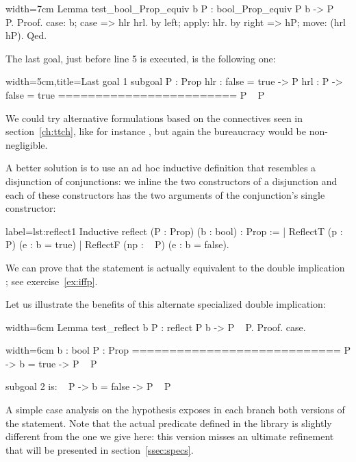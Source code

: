 \begin{coq}{}{width=7cm}
Lemma test_bool_Prop_equiv b P : bool_Prop_equiv P b -> P \/ ~ P.
Proof.
case: b; case => hlr hrl.
  by left; apply: hlr.
by right => hP; move: (hrl hP).
Qed.
\end{coq}

The last goal, just before line 5 is executed, is the following one:

\begin{coqout}{}{width=5cm,title=Last goal}
1 subgoal
P : Prop
hlr : false = true -> P
hrl : P -> false = true
========================
P \/ ~ P
\end{coqout}
We could try
alternative formulations based on the connectives seen in
section~\ref{ch:ttch}, like for instance
, but again the bureaucracy
would be non-negligible.

A better solution is
to use an ad hoc inductive definition that resembles a
disjunction of conjunctions: we inline the two constructors of a
disjunction and each of these constructors has the two arguments of
the conjunction's single constructor:

\begin{coq}{}{label=lst:reflect1}
Inductive reflect (P : Prop) (b : bool) : Prop :=
| ReflectT (p : P)    (e : b = true)
| ReflectF (np : ~ P) (e : b = false).
\end{coq}

We can prove that the statement  is actually equivalent
to the double implication ; see exercise~\ref{ex:iffp}.

Let us illustrate the benefits of this alternate specialized double
implication:

\begin{coq-left}{}{width=6cm}
Lemma test_reflect b P :
  reflect P b -> P \/ ~ P.
Proof.
case.
$~$
$~$
$~$
\end{coq-left}
\begin{coqout-right}{}{width=6cm}
  b : bool
  P : Prop
  ============================
   P -> b = true -> P \/ ~ P

subgoal 2 is:
 ~ P -> b = false -> P \/ ~ P
\end{coqout-right}

A simple case analysis on the hypothesis  exposes in
each branch both versions of the statement.
Note that the actual
 predicate defined in the  library is
slightly different from the one we give here:
this version misses an ultimate refinement
that will be presented in
section~\ref{ssec:specs}.

